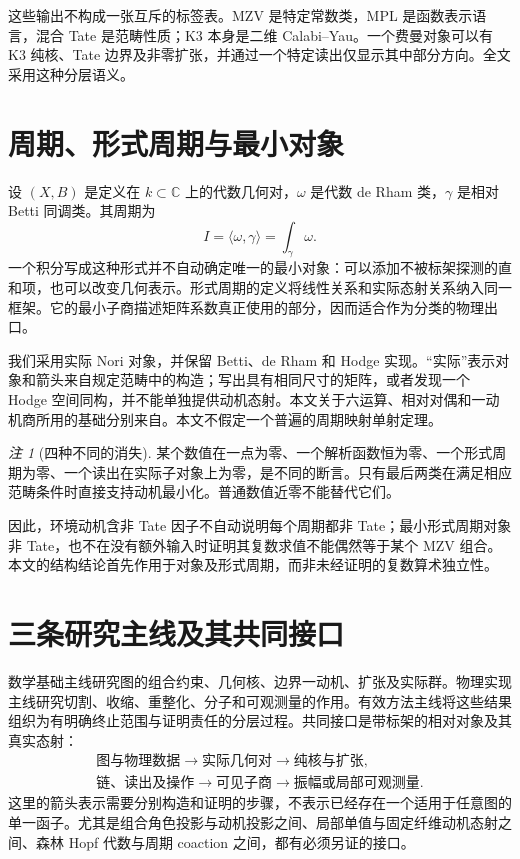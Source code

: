 \documentclass[11pt,a4paper,oneside]{ctexrep}
\theoremstyle{cnplain}
\theoremstyle{definition}
\theoremstyle{remark}
\newtheorem{remark}[theorem]{注}
\newcommand{\C}{\mathbb C}
\begin{document}
这些输出不构成一张互斥的标签表。MZV 是特定常数类，MPL 是函数表示语言，混合 Tate 是范畴性质；K3 本身是二维 Calabi--Yau。一个费曼对象可以有 K3 纯核、Tate 边界及非零扩张，并通过一个特定读出仅显示其中部分方向。全文采用这种分层语义。

\section{周期、形式周期与最小对象}
设 $(X,B)$ 是定义在 $k\subset\C$ 上的代数几何对，$\omega$ 是代数 de Rham 类，$\gamma$ 是相对 Betti 同调类。其周期为
\begin{equation}
 I=\langle\omega,\gamma\rangle=\int_\gamma\omega.
\end{equation}
一个积分写成这种形式并不自动确定唯一的最小对象：可以添加不被标架探测的直和项，也可以改变几何表示。形式周期的定义将线性关系和实际态射关系纳入同一框架\cite{brownperiods}。它的最小子商描述矩阵系数真正使用的部分，因而适合作为分类的物理出口。

我们采用实际 Nori 对象，并保留 Betti、de Rham 和 Hodge 实现。``实际''表示对象和箭头来自规定范畴中的构造；写出具有相同尺寸的矩阵，或者发现一个 Hodge 空间同构，并不能单独提供动机态射。本文关于六运算、相对对偶和一动机商所用的基础分别来自\cite{tubach,abv}。本文不假定一个普遍的周期映射单射定理。

\begin{remark}[四种不同的消失]
某个数值在一点为零、一个解析函数恒为零、一个形式周期为零、一个读出在实际子对象上为零，是不同的断言。只有最后两类在满足相应范畴条件时直接支持动机最小化。普通数值近零不能替代它们。
\end{remark}

因此，环境动机含非 Tate 因子不自动说明每个周期都非 Tate；最小形式周期对象非 Tate，也不在没有额外输入时证明其复数求值不能偶然等于某个 MZV 组合。本文的结构结论首先作用于对象及形式周期，而非未经证明的复数算术独立性。

\section{三条研究主线及其共同接口}
数学基础主线研究图的组合约束、几何核、边界一动机、扩张及实际群。物理实现主线研究切割、收缩、重整化、分子和可观测量的作用。有效方法主线将这些结果组织为有明确终止范围与证明责任的分层过程。共同接口是带标架的相对对象及其真实态射：
\begin{equation}
\begin{gathered}
 \text{图与物理数据}\longrightarrow\text{实际几何对}
 \longrightarrow\text{纯核与扩张},\\
 \text{链、读出及操作}\longrightarrow\text{可见子商}
 \longrightarrow\text{振幅或局部可观测量}.
\end{gathered}
\end{equation}
这里的箭头表示需要分别构造和证明的步骤，不表示已经存在一个适用于任意图的单一函子。尤其是组合角色投影与动机投影之间、局部单值与固定纤维动机态射之间、森林 Hopf 代数与周期 coaction 之间，都有必须另证的接口。
\end{document}
